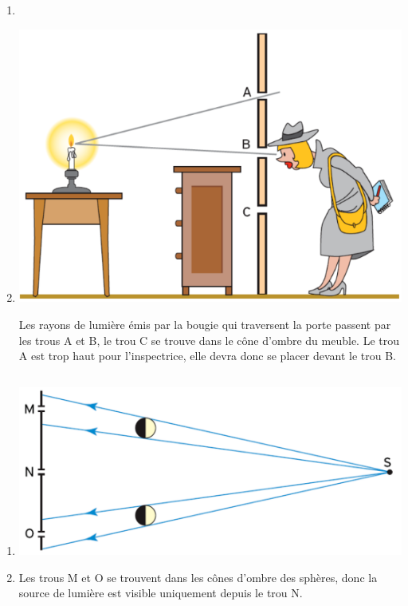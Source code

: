 \documentclass[12pt,a4paper]{article}
\begin{document}
\subsection*{}
	\begin{enumerate}[label=\alph*)]
		\item %
		
		\item \begin{center}
			\includegraphics[scale=0.5]{exo8}
		\end{center}
		
	Les rayons de lumière émis par la bougie qui traversent la porte passent par les trous A et B, le trou C se trouve dans le cône d'ombre du meuble. Le trou A est trop haut pour l'inspectrice, elle devra donc se placer devant le trou B.
	\end{enumerate}

\subsection*{}
	\begin{enumerate}[label=\alph*)]
		\item \begin{center}
			\includegraphics[scale=0.4]{exo10}
		\end{center}
	
		\item Les trous M et O se trouvent dans les cônes d'ombre des sphères, donc la source de lumière est visible uniquement depuis le trou N.
	\end{enumerate}
\end{document}
